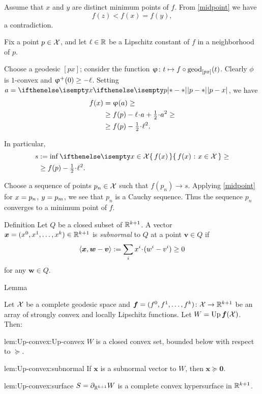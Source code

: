 Assume that $x$ and $y$ are distinct minimum points of $f$. 
From \ref{midpoint} we have
\[f(z)<f(x)=f(y),\] 
a contradiction. 

Fix a point $p\in \spc{X}$, and
let $\Lip\in\RR$ be a Lipschitz constant of $f$ in a neighborhood of $p$.

Choose a geodesic $[px]$;
consider the function $\phi\:t\mapsto f\circ\geod_{[px]}(t)$.
Clearly $\phi$ is $1$-convex and $\phi^+(0)\ge -\Lip$.
Setting $a=\dist{p}{x}{}$, we have 
\begin{align*}
f(x)
&=
\phi(a)
\ge
\\
&\ge
f(p)-\Lip\cdot a+\tfrac{1}{2}\cdot a^2
\ge
\\
&\ge f(p)-\tfrac{1}{2}\cdot{\Lip^2}.
\end{align*}

In particular,
\begin{align*}
s
&\df
\inf\set{f(x)}{x\in \spc{X}}
\ge
\\
&\ge
f(p)-\tfrac{1}{2}\cdot{\Lip^2}.
\end{align*}

Choose a sequence of points $p_n\in \spc{X}$ such that $f(p_n)\to s$.
Applying \ref{midpoint} for $x\z=p_n$, $y\z=p_m$, we see that $p_n$ is a Cauchy sequence.
Thus the sequence $p_n$ converges to a minimum point of $f$.
\qeds

\begin{thm}{Definition}
Let $Q$ be a closed subset of $\mathbb{R}^{k+1}$.
A vector $\bm{x}\z=(x^0,x^1,\dots,x^\kay)\in\RR^{\kay+1}$
is \emph{subnormal} to $Q$ at a point $\bm{v}\in Q$ 
if
\[\<\bm{x},\bm{w}-\bm{v}\>
\df
\sum_ix^i\cdot(w^i-v^i)
\ge 0\]
for any $\bm{w}\in Q$.
\end{thm}


\begin{thm}{Lemma}\label{lem:Up-convex}{\sloppy 
Let $\mathcal{X}$ be a complete geodesic space 
and $\bm{f}\z=(f^0,f^1,\dots,f^\kay)\:\spc{X}\to\RR^{\kay+1}$ 
be an array of strongly convex and locally Lipschitz functions.
Let $W=\mathop{\rm Up}\nolimits\bm{f}(\mathcal{X})$.
Then: 

}
\begin{subthm}{lem:Up-convex:Up-convex}
$W$ is a closed convex set, bounded below with respect to $\succcurlyeq$.
\end{subthm}

\begin{subthm}{lem:Up-convex:subnormal}
If $\bm{x}$ is a subnormal vector to $W$, then $\bm{x}\succcurlyeq\bm{0}$.
\end{subthm}

\begin{subthm}{lem:Up-convex:surface}
 $S=\partial_{\mathbb{R}^{k+1}}W$ is a complete convex hypersurface in $\mathbb{R}^{k+1}$.
\end{subthm}

\end{thm}


